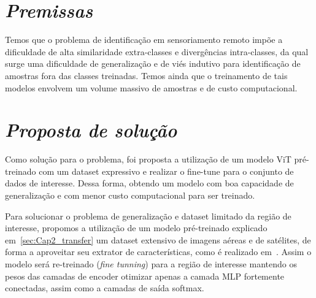 



\section{\textit{Premissas}}\label{sec:Cap3_Premissas}

Temos que o problema de identificação em sensoriamento remoto impõe a dificuldade de alta similaridade extra-classes e divergências intra-classes, da qual surge uma dificuldade de generalização e de viés indutivo para identificação de amostras fora das classes treinadas. Temos ainda que o treinamento de tais modelos envolvem um volume massivo de amostras e de custo computacional. 



\section{\textit{Proposta de solução}}\label{sec:Cap3_Proposta}

Como solução para o problema, foi proposta a utilização de um modelo ViT pré-treinado com um dataset expressivo e realizar o fine-tune para o conjunto de dados de interesse. Dessa forma, obtendo um modelo com boa capacidade de generalização e com menor custo computacional para ser treinado.

Para solucionar o problema de generalização e dataset limitado da região de interesse, propomos a utilização de um modelo pré-treinado explicado em~\ref{sec:Cap2_transfer} um dataset extensivo de imagens aéreas e de satélites, de forma a aproveitar seu extrator de características, como é realizado em~\cite{wang2022empirical}. Assim o modelo será re-treinado (\textit{fine tunning}) para a região de interesse mantendo os pesos das camadas de encoder otimizar apenas a camada MLP fortemente conectadas, assim como a camadas de saída softmax. 

